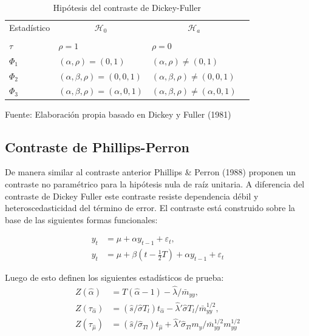 \documentclass[12pt, twoside]{book}\usepackage[]{graphicx}\usepackage[]{color}
\numberwithin{equation}{section}
\numberwithin{theorem}{section}
\numberwithin{teorema}{section}
\numberwithin{defi}{section}
\numberwithin{prop}{section}
\numberwithin{defi}{section}
\theoremstyle{plain}
\begin{document}
\begin{table}[!htpb]
\centering
\begin{threeparttable}
\caption{Hipótesis del contraste de Dickey-Fuller}
\begin{tabular}{@{}llrllll@{}}
\toprule
\multicolumn{2}{l}{Estadístico} & \multicolumn{2}{c}{$\mathcal{H}_{0}$} &
\multicolumn{2}{c}{$\mathcal{H}_{a}$} \\
\cmidrule(l){3-4} \cmidrule(l){5-6} \\
\multicolumn{2}{l}{$\tau$} & 
\multicolumn{2}{l}{$\rho =1 $} & 
\multicolumn{2}{l}{$\rho =0 $} \\
\multicolumn{2}{l}{$\Phi_{1}$} &
\multicolumn{2}{l}{$(\alpha,\rho)=(0,1)$} &
\multicolumn{2}{l}{$(\alpha,\rho)\neq(0,1)$} \\
\multicolumn{2}{l}{$\Phi_{2}$} &
\multicolumn{2}{l}{$(\alpha,\beta, \rho)=(0,0,1)$} &
\multicolumn{2}{l}{$(\alpha,\beta,\rho)\neq(0,0,1)$} \\
\multicolumn{2}{l}{$\Phi_{3}$} &
\multicolumn{2}{l}{$(\alpha,\beta, \rho)=(\alpha,0,1)$} &
\multicolumn{2}{l}{$(\alpha,\beta,\rho)\neq(\alpha,0,1)$} \\
\bottomrule
\end{tabular}
\label{tab-1}
\begin{tablenotes}
\small
\item Fuente: Elaboración propia basado en Dickey y Fuller (1981)
\end{tablenotes}
\end{threeparttable}
\end{table}

\subsection{Contraste de Phillips-Perron}

De manera similar al contraste anterior Phillips \& Perron (1988) proponen un contraste no paramétrico para la hipótesis nula de raíz unitaria. A diferencia del contraste de Dickey Fuller este contraste resiste dependencia débil y heteroscedasticidad del término de error. El contraste está construido sobre la base de las siguientes formas funcionales: 

\begin{align}
y_{t} & = \mu+\alpha y_{t-1}+\varepsilon_{t}, \\ 
y_{t} & = \mu+\beta\left(t-\frac{1}{2}T\right)+\alpha y_{t-1}+\varepsilon_{t}
\end{align}

Luego de esto definen los siguientes estadísticos de prueba: 
\begin{align}
Z(\hat{\alpha}) & = T(\hat{\alpha}-1)-\hat{\lambda}/\bar{m}_{yy}, \label{eq:pp1}\\ 
Z(\tau_{\hat{\alpha}}) & = (\hat{s}/\hat{\sigma}T_{l})t_{\hat{\alpha}}-\hat{\lambda}'\hat{\sigma}T_{l}/\bar{m}^{1/2}_{yy}, \\ 
Z(\tau_{\hat{\mu}}) & = (\hat{s}/\hat{\sigma}_{Tl})t_{\hat{\mu}}+\hat{\lambda}'\hat{\sigma}_{Tl}m_{y}/\bar{m}^{1/2}_{yy}m^{1/2}_{yy} \label{eq:pp3}
\end{align}
\end{document}
